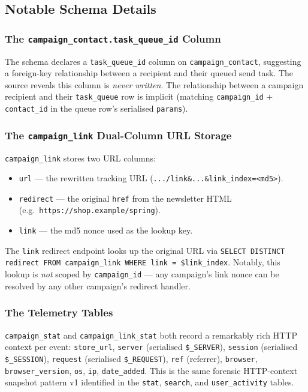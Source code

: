 \documentclass[11pt,a4paper]{article}
\begin{document}
\subsection{Notable Schema Details}

\subsubsection{The \texttt{campaign\_contact.task\_queue\_id} Column}

The schema declares a \texttt{task\_queue\_id} column on
\texttt{campaign\_contact}, suggesting a foreign-key relationship
between a recipient and their queued send task. The source reveals
this column is \emph{never written}. The relationship between a
campaign recipient and their \texttt{task\_queue} row is implicit
(matching \texttt{campaign\_id} + \texttt{contact\_id} in the
queue row's serialised \texttt{params}).

\subsubsection{The \texttt{campaign\_link} Dual-Column URL Storage}

\texttt{campaign\_link} stores two URL columns:

\begin{itemize}[leftmargin=1.6em,itemsep=2pt]
  \item \texttt{url} --- the rewritten tracking URL
        (\texttt{.../link\&...\&link\_index=<md5>}).
  \item \texttt{redirect} --- the original \texttt{href} from the
        newsletter HTML (e.g.\ \texttt{https://shop.example/spring}).
  \item \texttt{link} --- the md5 nonce used as the lookup key.
\end{itemize}

The \texttt{link} redirect endpoint looks up the original URL via
\texttt{SELECT DISTINCT redirect FROM campaign\_link WHERE link =
\$link\_index}. Notably, this lookup is \emph{not} scoped by
\texttt{campaign\_id} --- any campaign's link nonce can be
resolved by any other campaign's redirect handler.

\subsubsection{The Telemetry Tables}

\texttt{campaign\_stat} and \texttt{campaign\_link\_stat} both
record a remarkably rich HTTP context per event:
\texttt{store\_url}, \texttt{server} (serialised
\texttt{\$\_SERVER}), \texttt{session} (serialised
\texttt{\$\_SESSION}), \texttt{request} (serialised
\texttt{\$\_REQUEST}), \texttt{ref} (referrer),
\texttt{browser}, \texttt{browser\_version}, \texttt{os},
\texttt{ip}, \texttt{date\_added}. This is the same forensic
HTTP-context snapshot pattern v1 identified in the
\texttt{stat}, \texttt{search}, and \texttt{user\_activity}
tables.
\end{document}
